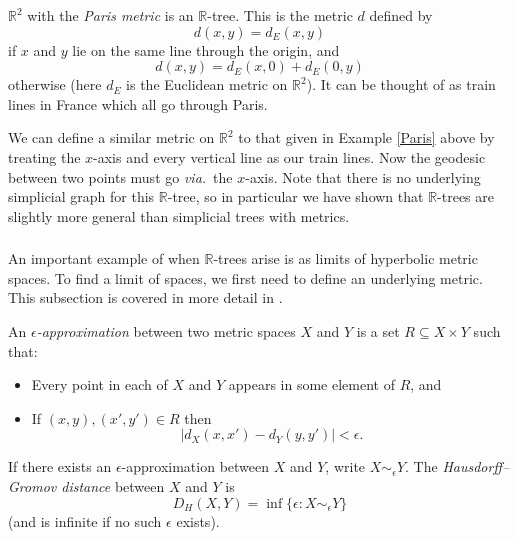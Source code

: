 \begin{example}\label{Paris}
    $\mathbb{R}^2$ with the \textit{Paris metric} is an $\mathbb{R}$-tree. This is the metric $d$ defined by\[d(x,y)=d_E(x,y)\]if $x$ and $y$ lie on the same line through the origin, and\[d(x,y)=d_E(x,0)+d_E(0,y)\] otherwise (here $d_E$ is the Euclidean metric on $\mathbb{R}^2$). It can be thought of as train lines in France which all go through Paris.
\end{example}

\begin{example}\label{xtrains}
    We can define a similar metric on $\mathbb{R}^2$ to that given in Example \ref{Paris} above by treating the $x$-axis and every vertical line as our train lines. Now the geodesic between two points must go %
    \textit{via.}~the $x$-axis. Note that there is no underlying simplicial graph for this $\mathbb{R}$-tree, so in particular we have shown that $\mathbb{R}$-trees are slightly more general than simplicial trees with metrics.
\end{example}

\subsubsection{} An important example of when $\mathbb{R}$-trees arise is as limits of hyperbolic metric spaces. To find a limit of spaces, we first need to define an underlying metric. This subsection is covered in more detail in \cite[Section 1]{BridsonSwarup}.

\begin{definition}
    An $\epsilon$\emph{-approximation} between two metric spaces $X$ and $Y$ is a set $R\subseteq X\times Y$ such that:
    \begin{itemize}
        \item Every point in each of $X$ and $Y$ appears in some element of $R$, and
        \item If $(x,y),(x',y')\in R$ then \[\lvert d_X(x,x')-d_Y(y,y')\rvert<\epsilon.\]
    \end{itemize}
    If there exists an $\epsilon$-approximation between $X$ and $Y$, write $X\sim_\epsilon Y$. The \emph{Hausdorff--Gromov distance} between $X$ and $Y$ is \[D_H(X,Y)=\inf\{\epsilon:X\sim_\epsilon Y\}\] (and is infinite if no such $\epsilon$ exists).
\end{definition}

